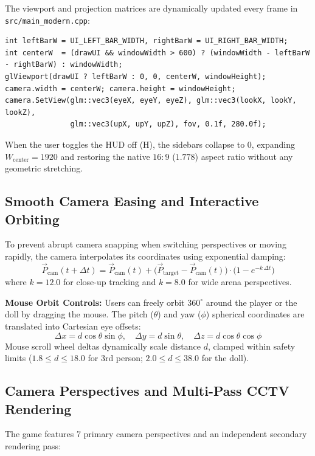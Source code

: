 \documentclass[11pt,a4paper]{article}
\newcommand{\keybox}[1]{\colorbox{rowgray}{\ttfamily #1}}
\begin{document}
The viewport and projection matrices are dynamically updated every frame in \texttt{src/main\_modern.cpp}:
\begin{lstlisting}
int leftBarW = UI_LEFT_BAR_WIDTH, rightBarW = UI_RIGHT_BAR_WIDTH;
int centerW  = (drawUI && windowWidth > 600) ? (windowWidth - leftBarW - rightBarW) : windowWidth;
glViewport(drawUI ? leftBarW : 0, 0, centerW, windowHeight);
camera.width = centerW; camera.height = windowHeight;
camera.SetView(glm::vec3(eyeX, eyeY, eyeZ), glm::vec3(lookX, lookY, lookZ),
               glm::vec3(upX, upY, upZ), fov, 0.1f, 280.0f);
\end{lstlisting}
When the user toggles the HUD off (\keybox{H}), the sidebars collapse to 0, expanding $W_{\text{center}} = 1920$
and restoring the native $16:9$ ($1.778$) aspect ratio without any geometric stretching.

\subsection{Smooth Camera Easing and Interactive Orbiting}
To prevent abrupt camera snapping when switching perspectives or moving rapidly, the camera interpolates
its coordinates using exponential damping:
\begin{equation}
\vec{P}_{\text{cam}}(t + \Delta t) = \vec{P}_{\text{cam}}(t) + \big(\vec{P}_{\text{target}} - \vec{P}_{\text{cam}}(t)\big) \cdot \big(1 - e^{-k\,\Delta t}\big)
\end{equation}
where $k = 12.0$ for close-up tracking and $k = 8.0$ for wide arena perspectives.

\textbf{Mouse Orbit Controls:}
Users can freely orbit $360^\circ$ around the player or the doll by dragging the mouse. The pitch ($\theta$)
and yaw ($\phi$) spherical coordinates are translated into Cartesian eye offsets:
\begin{equation}
\Delta x = d \cos\theta \sin\phi, \quad \Delta y = d \sin\theta, \quad \Delta z = d \cos\theta \cos\phi
\end{equation}
Mouse scroll wheel deltas dynamically scale distance $d$, clamped within safety limits ($1.8 \le d \le 18.0$
for 3rd person; $2.0 \le d \le 38.0$ for the doll).

\subsection{Camera Perspectives and Multi-Pass CCTV Rendering}
The game features 7 primary camera perspectives and an independent secondary rendering pass:
\end{document}
